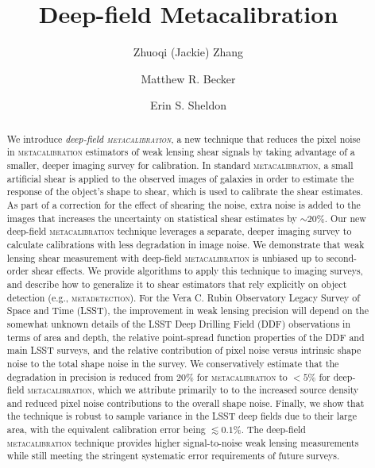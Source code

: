 \documentclass[twocolumn]{openjournal}
\makeatletter
\newcommand{\mdet}{\textsc{metadetection}\@\xspace}
\newcommand{\mcal}{\textsc{metacalibration}\@\xspace}
\makeatother
\begin{document}
\title{Deep-field Metacalibration}

\author{Zhuoqi (Jackie) Zhang}
\author{Matthew R. Becker}
\author{Erin S. Sheldon}


\begin{abstract}

    We introduce \textit{deep-field \textsc{metacalibration}}, a new technique
    that reduces the pixel noise in \mcal estimators of weak lensing shear
    signals by taking advantage of a smaller, deeper imaging survey for
    calibration. In standard \mcal, a small artificial shear is applied to the
    observed images of galaxies in order to estimate the response of the
    object's shape to shear, which is used to calibrate the shear estimates.
    As part of a correction for the effect of shearing the noise, extra noise
    is added to the images that increases the uncertainty on statistical shear
    estimates by $\sim 20$\%.  Our new deep-field \mcal technique leverages a
    separate, deeper imaging survey to calculate calibrations with less
    degradation in image noise.  We demonstrate that weak lensing shear
    measurement with deep-field \mcal is unbiased up to second-order shear
    effects.  We provide algorithms to apply this technique to imaging surveys,
    and describe how to generalize it to shear estimators that rely explicitly
    on object detection (e.g., \mdet).   For the Vera C. Rubin Observatory
    Legacy Survey of Space and Time (LSST), the improvement in weak lensing
    precision will depend on the somewhat unknown details of the LSST Deep
    Drilling Field (DDF) observations in terms of area and depth, the relative
    point-spread function properties of the DDF and main LSST surveys, and the
    relative contribution of pixel noise versus intrinsic shape noise to the
    total shape noise in the survey. We conservatively estimate that the
    degradation in precision is reduced from 20\% for \mcal to $<5$\% for
    deep-field \mcal, which we attribute primarily to to the increased source
    density and reduced pixel noise contributions to the overall shape noise.
    Finally, we show that the technique is robust to sample variance in the
    LSST deep fields due to their large area, with the equivalent calibration
    error being $\lesssim0.1\%$. The deep-field \mcal technique provides higher
    signal-to-noise weak lensing measurements while still meeting the stringent
    systematic error requirements of future surveys.


\end{abstract}
\end{document}
